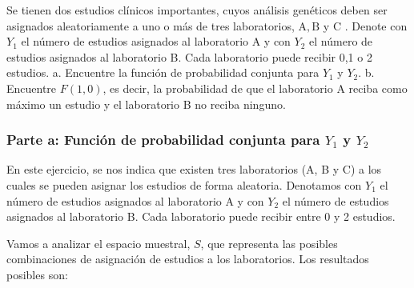 \documentclass[
]{article}
\begin{document}
Se tienen dos estudios clínicos importantes, cuyos análisis genéticos deben ser asignados aleatoriamente a uno o más de tres laboratorios, \(\mathrm{A}, \mathrm{B}\) y C . Denote con \(Y_{1}\) el número de estudios asignados al laboratorio A y con \(Y_{2}\) el número de estudios asignados al laboratorio B. Cada laboratorio puede recibir 0,1 o 2 estudios.
a. Encuentre la función de probabilidad conjunta para \(Y_{1}\) y \(Y_{2}\).
b. Encuentre \(F(1,0)\), es decir, la probabilidad de que el laboratorio A reciba como máximo un estudio y el laboratorio B no reciba ninguno.

\subsubsection{\texorpdfstring{Parte a: Función de probabilidad conjunta para \(Y_1\) y \(Y_2\)}{Parte a: Función de probabilidad conjunta para Y\_1 y Y\_2}}\label{parte-a-funciuxf3n-de-probabilidad-conjunta-para-y_1-y-y_2}

En este ejercicio, se nos indica que existen tres laboratorios (A, B y C) a los cuales se pueden asignar los estudios de forma aleatoria. Denotamos con \(Y_1\) el número de estudios asignados al laboratorio A y con \(Y_2\) el número de estudios asignados al laboratorio B. Cada laboratorio puede recibir entre 0 y 2 estudios.

Vamos a analizar el espacio muestral, \(S\), que representa las posibles combinaciones de asignación de estudios a los laboratorios. Los resultados posibles son:
\end{document}
